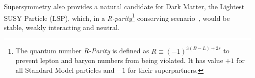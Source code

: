 
Supersymmetry also provides a natural candidate
for Dark Matter, the Lightest SUSY Particle (LSP), 
which, in a {\it R-parity}\footnote{The quantum number 
\textit{R-Parity} is defined as $R \equiv (-1)^{3(B-L) + 2s}$
to prevent lepton and baryon numbers from being violated.
It has value $+1$ for all Standard Model particles 
and $-1$ for their superpartners.} 
conserving scenario~\cite{Martin:1997ns},
would be stable, weakly interacting and neutral.



